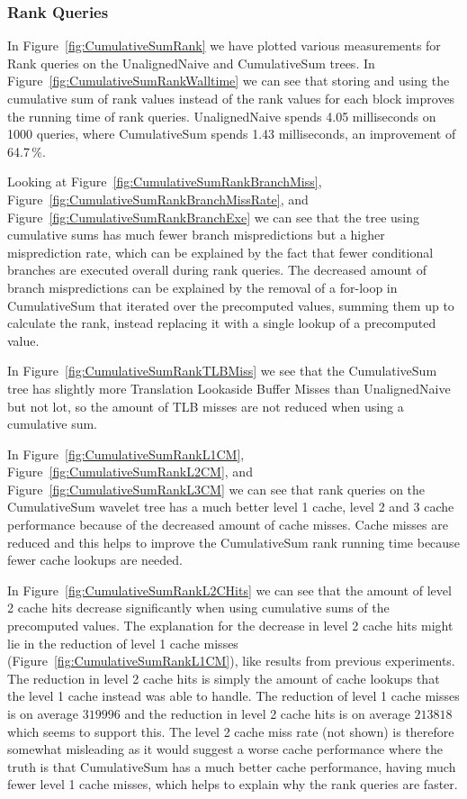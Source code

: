 \restoregeometry

\subsubsection{Rank Queries}
In Figure~\ref{fig:CumulativeSumRank} we have plotted various measurements for Rank queries on the UnalignedNaive and CumulativeSum trees.
In Figure~\ref{fig:CumulativeSumRankWalltime} we can see that storing and using the cumulative sum of rank values instead of the rank values for each block improves the running time of rank queries.
UnalignedNaive spends 4.05 milliseconds on 1000 queries, where CumulativeSum spends 1.43 milliseconds, an improvement of 64.7\,\%.

Looking at Figure~\ref{fig:CumulativeSumRankBranchMiss}, Figure~\ref{fig:CumulativeSumRankBranchMissRate}, and Figure~\ref{fig:CumulativeSumRankBranchExe} we can see that the tree using cumulative sums has much fewer branch mispredictions but a higher misprediction rate, which can be explained by the fact that fewer conditional branches are executed overall during rank queries.
The decreased amount of branch mispredictions can be explained by the removal of a for-loop in CumulativeSum that iterated over the precomputed values, summing them up to calculate the rank, instead replacing it with a single lookup of a precomputed value.

In Figure~\ref{fig:CumulativeSumRankTLBMiss} we see that the CumulativeSum tree has slightly more Translation Lookaside Buffer Misses than UnalignedNaive but not lot, so the amount of TLB misses are not reduced when using a cumulative sum.

In Figure~\ref{fig:CumulativeSumRankL1CM}, Figure~\ref{fig:CumulativeSumRankL2CM}, and Figure~\ref{fig:CumulativeSumRankL3CM} we can see that rank queries on the CumulativeSum wavelet tree has a much better level 1 cache, level 2 and 3 cache performance because of the decreased amount of cache misses.
Cache misses are reduced and this helps to improve the CumulativeSum rank running time because fewer cache lookups are needed.

In Figure~\ref{fig:CumulativeSumRankL2CHits} we can see that the amount of level 2 cache hits decrease significantly when using cumulative sums of the precomputed values.
The explanation for the decrease in level 2 cache hits might lie in the reduction of level 1 cache misses (Figure~\ref{fig:CumulativeSumRankL1CM}), like results from previous experiments.
The reduction in level 2 cache hits is simply the amount of cache lookups that the level 1 cache instead was able to handle.
The reduction of level 1 cache misses is on average $\num{319996}$ and the reduction in level 2 cache hits is on average $\num{213818}$ which seems to support this.
The level 2 cache miss rate (not shown) is therefore somewhat misleading as it would suggest a worse cache performance where the truth is that CumulativeSum has a much better cache performance, having much fewer level 1 cache misses, which helps to explain why the rank queries are faster.



